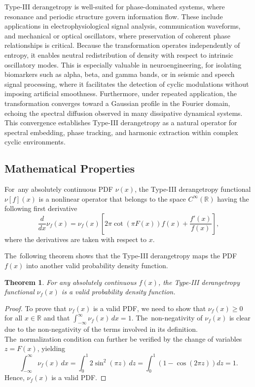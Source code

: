 \documentclass[sn-mathphys-num]{sn-jnl}%
\theoremstyle{thmstyleone}%
\newtheorem{theorem}{Theorem}%
\theoremstyle{thmstyletwo}%
\theoremstyle{thmstylethree}%
\begin{document}
Type-III derangetropy is well-suited for phase-dominated systems, where resonance and periodic structure govern information flow. These include applications in electrophysiological signal analysis, communication waveforms, and mechanical or optical oscillators, where preservation of coherent phase relationships is critical. Because the transformation operates independently of entropy, it enables neutral redistribution of density with respect to intrinsic oscillatory modes. This is especially valuable in neuroengineering, for isolating biomarkers such as alpha, beta, and gamma bands, or in seismic and speech signal processing, where it facilitates the detection of cyclic modulations without imposing artificial smoothness. Furthermore, under repeated application, the transformation converges toward a Gaussian profile in the Fourier domain, echoing the spectral diffusion observed in many dissipative dynamical systems. This convergence establishes Type-III derangetropy as a natural operator for spectral embedding, phase tracking, and harmonic extraction within complex cyclic environments.

\subsection{Mathematical Properties}

For~any absolutely continuous PDF $\nu(x)$, the Type-III derangetropy functional $\nu[f](x)$ is a nonlinear operator that belongs to the space $C^{\infty}(\mathbb{R})$ having the following first derivative\vspace{6pt}
\begin{equation}
	\label{Eq:Derivative}
	\frac{d}{dx} \nu_f(x) = \nu_f(x) \left[ 2\pi \cot(\pi F(x)) f(x) + \frac{f'(x)}{f(x)} \right],
\end{equation}
where the derivatives are taken with respect to $x$. 

The~following theorem shows that the Type-III derangetropy maps the PDF $f(x)$ into another valid probability density function.
\begin{theorem}
	For any absolutely continuous $f(x)$, the Type-III derangetropy functional $\nu_f(x)$ is a valid probability density function.
\end{theorem}
\begin{proof}
	To prove that $\nu_f(x)$ is a valid PDF, we need to show that $\nu_f(x) \geq 0$ for all $x \in \mathbb{R}$ and that $\int_{-\infty}^{\infty} \nu_f(x) \, dx = 1$. The~non-negativity of $\nu_f(x)$ is clear due to the non-negativity of the terms involved in its definition. The~normalization condition can further be verified by the change of variables $z = F(x)$, yielding
	\begin{equation}
		\int_{-\infty}^{\infty} \nu_f(x) \, dx = \int_{0}^{1} 2 \sin^2(\pi z)\   dz=\int_0^1(1-\cos (2 \pi z)) d z= 1.
	\end{equation}	
	Hence, $\nu_f(x)$ is a valid PDF.
\end{proof}
\end{document}
